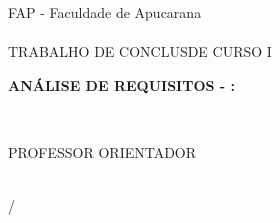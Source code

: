 
\begin{titlepage}
\label{pro:capa}
  \begin{center}
    FAP - Faculdade de Apucarana\\
    \Curso\\
    TRABALHO DE CONCLUS\AO DE CURSO I\\
    \vfill

    \textbf{ANÁLISE DE REQUISITOS - \NOME: \ASSUNTO}\\
    \vfill

    \AUTOR\\
    \vfill

    PROFESSOR ORIENTADOR\\
    \ORIENTADOR\\
    \vfill

    \begin{espacosimples}
      {\LOCAL}/{\DATA}
    \end{espacosimples}
  \end{center}
\end{titlepage}

